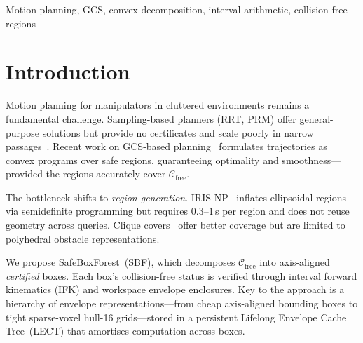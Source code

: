 \documentclass[journal]{IEEEtran}
\newcommand{\Cfree}{\mathcal{C}_\text{free}}
\begin{document}
\begin{IEEEkeywords}
Motion planning, GCS, convex decomposition, interval arithmetic,
collision-free regions
\end{IEEEkeywords}

\section{Introduction}\label{sec:intro}

Motion planning for manipulators in cluttered environments
remains a fundamental challenge.
Sampling-based planners (RRT, PRM) offer general-purpose
solutions but provide no certificates and scale poorly in
narrow passages~\cite{lavalle2006planning}.
Recent work on GCS-based planning~\cite{marcucci2024motion}
formulates trajectories as convex programs over
safe regions, guaranteeing optimality and smoothness---provided
the regions accurately cover $\Cfree$.

The bottleneck shifts to \emph{region generation}.
IRIS-NP~\cite{werner2024fast} inflates ellipsoidal regions
via semidefinite programming but requires $0.3$--$1$\,s per
region and does not reuse geometry across queries.
Clique covers~\cite{amice2024clique} offer better coverage but
are limited to polyhedral obstacle representations.

We propose SafeBoxForest~(SBF), which decomposes $\Cfree$
into axis-aligned \emph{certified} boxes.
Each box's collision-free status is verified through
interval forward kinematics (IFK) and workspace envelope
enclosures.
Key to the approach is a hierarchy of envelope
representations---from cheap axis-aligned bounding boxes to
tight sparse-voxel hull-16 grids---stored in a persistent
Lifelong Envelope Cache Tree~(LECT) that amortises computation
across boxes.
\end{document}
